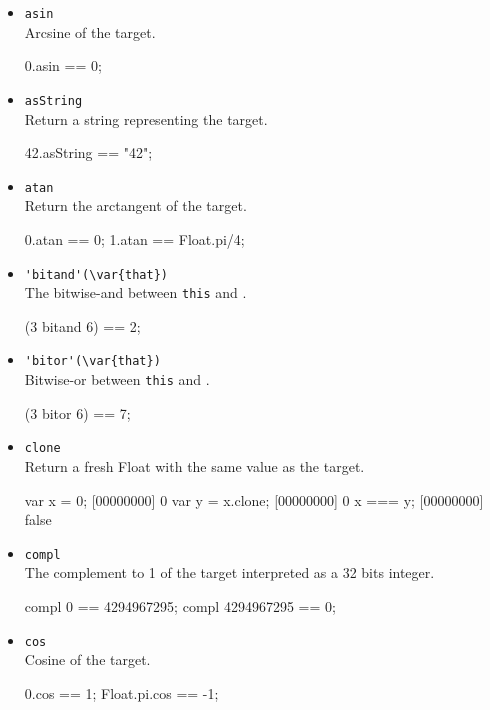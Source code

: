 \begin{itemize}
\item \lstinline|asin|\\
  Arcsine of the target.
\begin{urbiassert}[firstnumber=last]
0.asin == 0;
\end{urbiassert}

\item \lstinline|asString|\\
  Return a string representing the target.
\begin{urbiassert}[firstnumber=last]
42.asString == "42";
\end{urbiassert}

\item \lstinline|atan|\\
  Return the arctangent of the target.
\begin{urbiassert}[firstnumber=last]
0.atan == 0;
1.atan == Float.pi/4;
\end{urbiassert}

\item \lstinline|'bitand'(\var{that})|\\
  The bitwise-and between \lstinline|this| and .
\begin{urbiassert}[firstnumber=last]
(3 bitand 6) == 2;
\end{urbiassert}

\item \lstinline|'bitor'(\var{that})|\\
  Bitwise-or between \lstinline|this| and .
\begin{urbiassert}[firstnumber=last]
(3 bitor 6) == 7;
\end{urbiassert}

\item \lstinline|clone|\\
  Return a fresh Float with the same value as the target.
\begin{urbiscript}[firstnumber=last]
var x = 0;
[00000000] 0
var y = x.clone;
[00000000] 0
x === y;
[00000000] false
\end{urbiscript}

\item \lstinline|compl|\\
  The complement to 1 of the target interpreted as a 32 bits integer.
\begin{urbiassert}[firstnumber=last]
compl 0 == 4294967295;
compl 4294967295 == 0;
\end{urbiassert}

\item \lstinline|cos|\\
  Cosine of the target.
\begin{urbiassert}[firstnumber=last]
0.cos == 1;
Float.pi.cos == -1;
\end{urbiassert}


\end{itemize}
